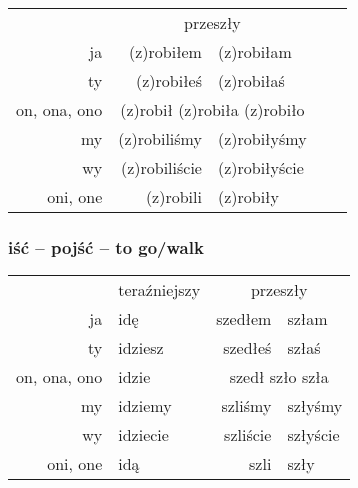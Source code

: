 \documentclass[12pt]{refcard}
\newcommand{\doublec}[1]{\multicolumn{2}{c}{#1}}
\begin{document}
\noindent
\begin{tabular}{rr@{ }lr@{ }l}
\footnotesize              & \doublec{\small \male~przeszły~\female} \\
\footnotesize ja           & (z)robiłem    & (z)robiłam              \\
\footnotesize ty           & (z)robiłeś    & (z)robiłaś              \\
\footnotesize on, ona, ono & \doublec{(z)robił (z)robiła (z)robiło}  \\
\footnotesize my           & (z)robiliśmy  & (z)robiłyśmy            \\
\footnotesize wy           & (z)robiliście & (z)robiłyście           \\
\footnotesize oni, one     & (z)robili     & (z)robiły               \\
\end{tabular}

\subsubsection{iść -- pojść -- to go/walk}
\vspace{-1ex}
\begin{tabular}{rlr@{~~}l}
\small              & \small teraźniejszy
\small              & \doublec{\small \male~przeszły~\female} \\
\small ja           & idę      & szedłem  & szłam          \\
\small ty           & idziesz  & szedłeś  & szłaś          \\
\small on, ona, ono & idzie    & \doublec{szedł szło szła} \\
\small my           & idziemy  & szliśmy  & szłyśmy        \\
\small wy           & idziecie & szliście & szłyście       \\
\small oni, one     & idą      & szli     & szły           \\
\end{tabular}

\vspace{-1ex}
\end{document}
